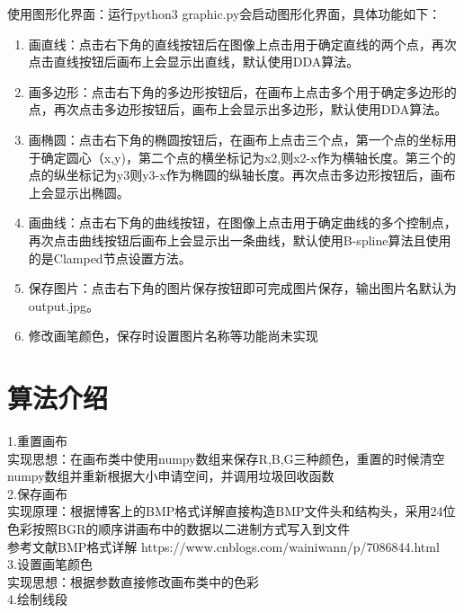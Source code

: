 \documentclass[a4paper,UTF8]{article}
\theoremstyle{definition}
\renewcommand\refname{参考文献}
\begin{document}
使用图形化界面：运行python3 graphic.py会启动图形化界面，具体功能如下：

\begin{enumerate}
\item 画直线：点击右下角的直线按钮后在图像上点击用于确定直线的两个点，再次点击直线按钮后画布上会显示出直线，默认使用DDA算法。
\item 画多边形：点击右下角的多边形按钮后，在画布上点击多个用于确定多边形的点，再次点击多边形按钮后，画布上会显示出多边形，默认使用DDA算法。 
\item 画椭圆：点击右下角的椭圆按钮后，在画布上点击三个点，第一个点的坐标用于确定圆心（x,y)，第二个点的横坐标记为x2,则x2-x作为横轴长度。第三个的点的纵坐标记为y3则y3-x作为椭圆的纵轴长度。再次点击多边形按钮后，画布上会显示出椭圆。 
\item 画曲线：点击右下角的曲线按钮，在图像上点击用于确定曲线的多个控制点，再次点击曲线按钮后画布上会显示出一条曲线，默认使用B-spline算法且使用的是Clamped节点设置方法。
\item 保存图片：点击右下角的图片保存按钮即可完成图片保存，输出图片名默认为output.jpg。
\item 修改画笔颜色，保存时设置图片名称等功能尚未实现

\end{enumerate}


\section{算法介绍}

\noindent{}1.重置画布\\

\indent{}实现思想：在画布类中使用numpy数组来保存R,B,G三种颜色，重置的时候清空numpy数组并重新根据大小申请空间，并调用垃圾回收函数\\

\noindent{}2.保存画布\\

\indent{}实现原理：根据博客上的BMP格式详解直接构造BMP文件头和结构头，采用24位色彩按照BGR的顺序讲画布中的数据以二进制方式写入到文件\\
\indent{}\refname{BMP格式详解 https://www.cnblogs.com/wainiwann/p/7086844.html}\\

\noindent{}3.设置画笔颜色\\

\indent{}实现思想：根据参数直接修改画布类中的色彩\\

\noindent{}4.绘制线段\\
\end{document}
